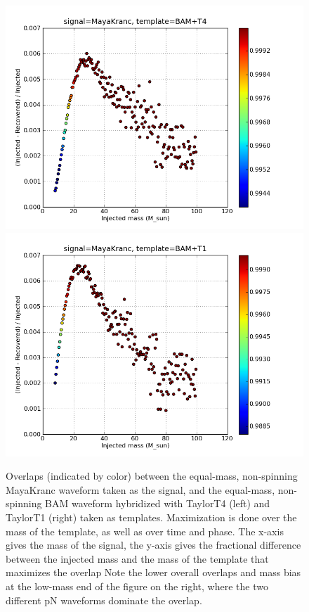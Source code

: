 \begin{figure}
  \includegraphics[width=0.5\linewidth]{figures/ninja2/maya_bamt4_max_over_m}
  \includegraphics[width=0.5\linewidth]{figures/ninja2/maya_bamt1_max_over_m}
  \caption[Overlaps between NINJA-2 submissions maximized over mass]{
  \label{f:ninja2_max_over_mass_bam}
Overlaps (indicated by color) between the equal-mass, non-spinning
MayaKranc waveform taken as the signal, and the equal-mass,
non-spinning BAM waveform hybridized with TaylorT4 (left) and TaylorT1
(right) taken as templates.  Maximization is done over the mass of the
template, as well as over time and phase.  The x-axis gives the mass
of the signal, the y-axis gives the fractional difference between the
injected mass and the mass of the template that maximizes the overlap
Note the lower overall overlaps and mass bias at the low-mass end of
the figure on the right, where the two different pN waveforms dominate
the overlap.}
\end{figure}%

